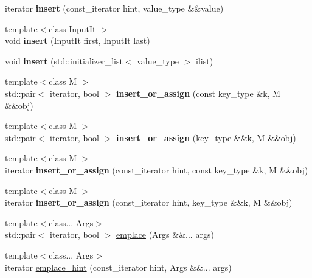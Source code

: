 \begin{DoxyCompactItemize}
iterator {\bfseries insert} (const\+\_\+iterator hint, value\+\_\+type \&\&value)
\item 
\mbox{\label{classtsl_1_1ordered__map_a3fb00b8a1c1438b57b584ea130ea5802}} 
{\footnotesize template$<$class Input\+It $>$ }\\void {\bfseries insert} (Input\+It first, Input\+It last)
\item 
\mbox{\label{classtsl_1_1ordered__map_a619a7ff2c2b7099493e7648280c908d1}} 
void {\bfseries insert} (std\+::initializer\+\_\+list$<$ value\+\_\+type $>$ ilist)
\item 
\mbox{\label{classtsl_1_1ordered__map_a91e27302fd65fda6dcb0c564d0970439}} 
{\footnotesize template$<$class M $>$ }\\std\+::pair$<$ iterator, bool $>$ {\bfseries insert\+\_\+or\+\_\+assign} (const key\+\_\+type \&k, M \&\&obj)
\item 
\mbox{\label{classtsl_1_1ordered__map_aa6e370fea27f1ede81ca8a5e72935033}} 
{\footnotesize template$<$class M $>$ }\\std\+::pair$<$ iterator, bool $>$ {\bfseries insert\+\_\+or\+\_\+assign} (key\+\_\+type \&\&k, M \&\&obj)
\item 
\mbox{\label{classtsl_1_1ordered__map_afd5ff2209a6eb47f55099cc63fe28a46}} 
{\footnotesize template$<$class M $>$ }\\iterator {\bfseries insert\+\_\+or\+\_\+assign} (const\+\_\+iterator hint, const key\+\_\+type \&k, M \&\&obj)
\item 
\mbox{\label{classtsl_1_1ordered__map_afb704714d98192790f9fa175838a6dee}} 
{\footnotesize template$<$class M $>$ }\\iterator {\bfseries insert\+\_\+or\+\_\+assign} (const\+\_\+iterator hint, key\+\_\+type \&\&k, M \&\&obj)
\item 
{\footnotesize template$<$class... Args$>$ }\\std\+::pair$<$ iterator, bool $>$ \mbox{\hyperlink{classtsl_1_1ordered__map_a817ba103f9be8980eed8da481902c144}{emplace}} (Args \&\&... args)
\item 
{\footnotesize template$<$class... Args$>$ }\\iterator \mbox{\hyperlink{classtsl_1_1ordered__map_a731379d1d7ea46787e4dc5c7a35d9d76}{emplace\+\_\+hint}} (const\+\_\+iterator hint, Args \&\&... args)

\end{DoxyCompactItemize}
